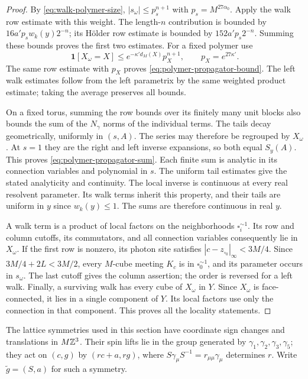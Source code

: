 \begin{proof}
By \eqref{eq:walk-polymer-size}, $|s_\omega|\le p_s^{n+1}$ with
$p_s=M^{27\alpha_0}$. Apply the walk row estimate with this weight.
The length-$n$ contribution is bounded by
$16a'p_sw_k(y)2^{-n}$; its H\"older row estimate is bounded by
$152a'p_s2^{-n}$. Summing these bounds proves the first two estimates.
For a fixed polymer use
\[
 \mathbf1[X_\omega=X]\le
       e^{-\kappa'd_M(X)}p_X^{n+1},\qquad p_X=e^{27\kappa'}.
\]
The same row estimate with $p_X$ proves
\eqref{eq:polymer-propagator-bound}. The left walk estimates follow
from the left parametrix by the same weighted product estimate; taking
the average preserves all bounds.

On a fixed torus, summing the row bounds over its finitely many unit
blocks also bounds the sum of the $N_\gamma$ norms of the individual
terms. The tails decay geometrically, uniformly in $(s,A)$. The series
may therefore be regrouped by $X_\omega$. At $s=1$ they are the right
and left inverse expansions, so both equal $S_y(A)$. This proves
\eqref{eq:polymer-propagator-sum}. Each finite sum is analytic in its
connection variables and polynomial in $s$. The uniform tail estimates
give the stated analyticity and continuity.
The local inverse is continuous at every real resolvent parameter.
Its walk terms inherit this property, and their tails are uniform in
$y$ since $w_k(y)\le1$. The sums are therefore continuous in real $y$.

A walk term is a product of local factors on the neighborhoods
$\square_i^{\sim1}$. Its row and column cutoffs, its commutators, and
all connection variables consequently lie in $X_\omega$. If the first
row is nonzero, its photon site satisfies
$|c-z_{\square_0}|_\infty<3M/4$. Since $3M/4+2L<3M/2$, every
$M$-cube meeting $K_c$ is in $\square_0^{\sim1}$, and its parameter
occurs in $s_\omega$. The last cutoff gives the column assertion;
the order is reversed for a left walk. Finally, a surviving walk has
every cube of $X_\omega$ in $Y$. Since $X_\omega$ is face-connected,
it lies in a single component of $Y$. Its local factors use only the
connection in that component. This proves all the locality statements.
\end{proof}
The lattice symmetries used in this section have coordinate sign
changes and translations in $M\mathbb Z^3$. Their spin lifts lie in the
group generated by $\gamma_1,\gamma_2,\gamma_3,\gamma_5$; they act
on $(c,g)$ by $(rc+a,rg)$, where
$S\gamma_\mu S^{-1}=r_{\mu\mu}\gamma_\mu$ determines $r$.
Write $\widetilde g=(S,a)$ for such a symmetry.
